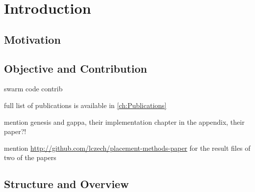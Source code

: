 
\chapter{Introduction}
\label{ch:Introduction}




\section{Motivation}
\label{ch:Introduction:sec:Motivation}


\section{Objective and Contribution}
\label{ch:Introduction:sec:ObjectiveContribution}

swarm code contrib \cite{Mahe2014,Mahe2015}

full list of publications is available in \ref{ch:Publications}

mention genesis and gappa, their implementation chapter in the appendix,
their paper?!

mention  \url{http://github.com/lczech/placement-methods-paper} for the result files of two of the papers


\section{Structure and Overview}
\label{ch:Introduction:sec:StructureOverview}
